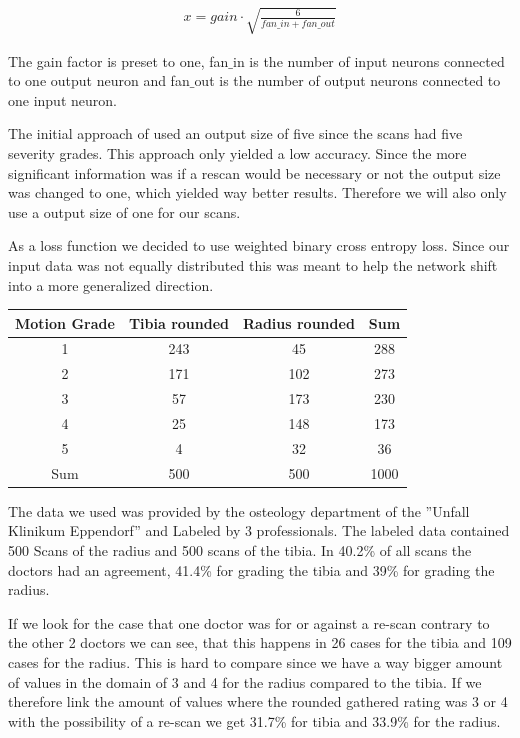 \documentclass[
a4paper, 
12pt,
grayscalebody, %
abstract=on,
twoside, BCOR10mm, 12pt, DIV13,headinclude, footexclude, final, abstracton, openright
]{ibireprt}
\numberwithin{equation}{chapter}
\numberwithin{table}{chapter}
\numberwithin{figure}{chapter}
\numberwithin{algorithm}{chapter}
\numberwithin{example}{chapter}
\numberwithin{example}{chapter}
\begin{document}
\begin{align}
	x = gain \cdot \sqrt{\frac{6}{fan\_in + fan\_out}}
\end{align}  

The gain factor is preset to one, fan$\_$in is the number of input neurons connected to one output neuron and fan$\_$out is the number of output neurons connected to one input neuron.

The initial approach of \cite{Walle2023} used an output size of five since the scans had five severity grades. This approach only yielded a low accuracy. Since the more significant information was if a rescan would be necessary or not the output size was changed to one, which yielded way better results. Therefore we will also only use a output size of one for our scans.

As a loss function we decided to use weighted binary cross entropy loss. Since our input data was not equally distributed this was meant to help the network shift into a more generalized direction.

\begin{center}
	\begin{tabular}{||c|c|c||c||}
		
		Motion Grade&  Tibia rounded& Radius rounded & Sum 	\\
		\hline
		\hline
		1 &  243&  45& 288   \\
		\hline
		2 &  171 & 102&  273\\
		\hline
		3 &  57&  173&  230 \\
		\hline
		4 &   25 & 148&  173 \\
		\hline
		5 &  4& 32&   36\\
		\hline
		\hline
		Sum&500&500&1000\\
		
		\hline
	\end{tabular}
\end{center}

The data we used was provided by the osteology department of the ''Unfall Klinikum Eppendorf'' and Labeled by 3 professionals.
The labeled data contained 500 Scans of the radius and 500 scans of the tibia. In  40.2\% of all scans the doctors had an agreement, 41.4\% for grading the tibia and 39\% for grading the radius. 

If we look for the case that one doctor was for or against a re-scan contrary to the other 2 doctors we can see, that this happens in 26 cases for the tibia and 109 cases for the radius.  This is hard to compare since we have a way bigger amount of values in the domain of 3 and 4 for the radius compared to the tibia. If we therefore link the amount of values where the rounded gathered rating was 3 or 4 with the possibility of a re-scan we get 31.7\% for tibia and  33.9\% for the radius.  %
\end{document}
